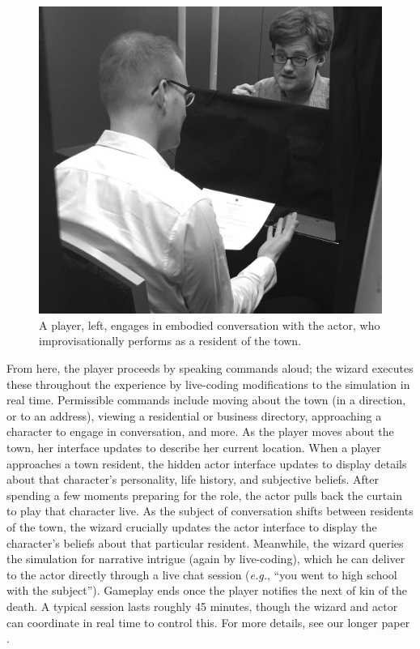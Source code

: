 \documentclass[letterpaper]{article}
\begin{document}
\begin{figure}[t]
  \centering
  \includegraphics[width=0.8\columnwidth]{player_and_actor.png}
  \caption{A player, left, engages in embodied conversation with the actor, who improvisationally performs as a resident of the town.}
  \label{fig:player_and_actor}
\end{figure}

From here, the player proceeds by speaking commands aloud; the wizard executes these throughout the experience by live-coding modifications to the simulation in real time. Permissible commands include moving about the town (in a direction, or to an address), viewing a residential or business directory, approaching a character to engage in conversation, and more. As the player moves about the town, her interface updates to describe her current location. When a player approaches a town resident, the hidden actor interface updates to display details about that character's personality, life history, and subjective beliefs. After spending a few moments preparing for the role, the actor pulls back the curtain to play that character live. As the subject of conversation shifts between residents of the town, the wizard crucially updates the actor interface to display the character's beliefs about that particular resident. Meanwhile, the wizard queries the simulation for narrative intrigue (again by live-coding), which he can deliver to the actor directly through a live chat session (\textit{e.g.}, ``you went to high school with the subject''). Gameplay ends once the player notifies the next of kin of the death. A typical session lasts roughly 45 minutes, though the wizard and actor can coordinate in real time to control this. For more details, see our longer paper \cite{samuel2016bad}.
\end{document}
